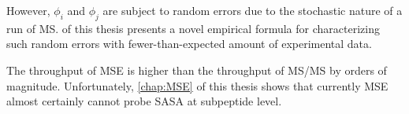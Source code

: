 However, \(\phi_i\) and \(\phi_j\) are subject to random errors due to the stochastic nature of a run of \gls{MS}.
 of this thesis presents a novel empirical formula for characterizing such random errors with fewer-than-expected amount of experimental data.

The throughput of \gls{MSE} is higher than the throughput of \gls{MS/MS} by orders of magnitude. 
Unfortunately, \cref{chap:MSE} of this thesis shows that currently \gls{MSE} almost certainly cannot probe \gls{SASA} at subpeptide level.
